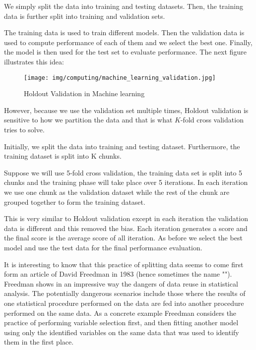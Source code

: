	We simply split the data into training and testing datasets. Then, the training data is further split into training and validation sets.
	
	The training data is used to train different models. Then the validation data is used to compute performance of each of them and we select the best one. Finally, the model is then used for the test set to evaluate performance. The next figure illustrates this idea:
	\begin{figure}[H]
		\centering
		\texttt{[image: img/computing/machine\_learning\_validation.jpg]}
		\caption{Holdout Validation in Machine learning}
	\end{figure}
	However, because we use the validation set multiple times, Holdout validation is sensitive to how we partition the data and that is what $K$-fold cross validation tries to solve.
	
	Initially, we split the data into training and testing dataset. Furthermore, the training dataset is split into K chunks.

	Suppose we will use 5-fold cross validation, the training data set is split into 5 chunks and the training phase will take place over 5 iterations. In each iteration we use one chunk as the validation dataset while the rest of the chunk are grouped together to form the training dataset.

	This is very similar to Holdout validation except in each iteration the validation data is different and this removed the bias. Each iteration generates a score and the final score is the average score of all iteration. As before we select the best model and use the test data for the final performance evaluation.
	
	It is interesting to know that this practice of splitting data seems to come first form an article of David Freedman \cite{freedman1983note} in 1983 (hence sometimes the name ""). Freedman shows in an impressive way the dangers of data reuse in statistical analysis. The potentially dangerous scenarios include those where the results of one statistical procedure performed on the data are fed into another procedure performed on the same data. As a concrete example Freedman considers the practice of performing variable selection first, and then fitting another model using only the identified variables on the same data that was used to identify them in the first place. 
	
